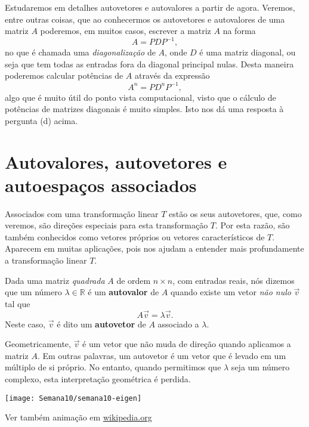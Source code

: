 Estudaremos em detalhes autovetores e autovalores a partir de agora. Veremos, entre outras coisas, que ao conhecermos os autovetores e autovalores de uma matriz $A$
poderemos, em muitos casos, escrever a matriz $A$ na forma
\begin{equation}A = P D P^{-1},\end{equation}
no que é chamada uma {\it diagonalização} de $A$, onde $D$ é uma matriz diagonal, ou seja que tem todas as entradas fora da diagonal principal nulas. Desta maneira poderemos calcular potências de $A$ através da expressão
\begin{equation}A^n = P D^n P^{-1},\end{equation}
algo que é muito útil do ponto vista computacional, visto que o cálculo de potências de matrizes diagonais é muito simples. Isto nos dá uma resposta à pergunta (d) acima.


\section{Autovalores, autovetores e autoespaços associados}


Associados com uma transformação linear $T$ estão os seus autovetores, que, como veremos, são direções especiais para esta transformação $T$. Por esta razão, são também conhecidos como vetores próprios ou vetores característicos de $T$. Aparecem em muitas aplicações, pois nos ajudam a entender mais profundamente a transformação linear $T$.

Dada uma matriz \textit{quadrada} $A$ de ordem $n \times n$, com entradas reais, nós dizemos que um número $\lambda \in \mathbb{R}$ é um \textbf{autovalor} de $A$ quando existe um vetor \textit{não nulo} $\vec{v}$ tal que
\begin{equation}
A \vec{v} = \lambda \vec{v}.
\end{equation} Neste caso, $\vec{v}$ é dito um \textbf{autovetor} de $A$ associado a $\lambda$.

Geometricamente, $\vec{v}$ é um vetor que não muda de direção quando aplicamos a matriz $A$. Em outras palavras, um autovetor é um vetor que é levado em um múltiplo de si próprio. No entanto, quando permitimos que $\lambda$ seja um número complexo, esta interpretação geométrica é perdida.

		\texttt{[image: Semana10/semana10-eigen]}

\noindent Ver também animação em \href{https://en.wikipedia.org/wiki/Eigenvalues_and_eigenvectors#Matrix_examples}{wikipedia.org}

